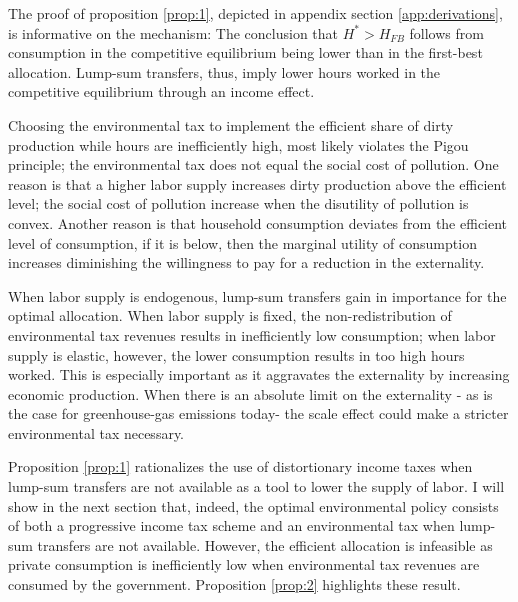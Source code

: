 

The proof of proposition \ref{prop:1}, depicted in appendix section \ref{app:derivations}, is informative on the mechanism: The conclusion that $H^*>H_{FB}$ follows from consumption in the competitive equilibrium being lower than in the first-best allocation. Lump-sum transfers, thus, imply lower hours worked in the competitive equilibrium through an income effect.

Choosing the environmental tax to implement the efficient share of dirty production while hours are inefficiently high, most likely  violates the Pigou principle; the environmental tax does not equal the social cost of pollution. One reason is that a higher labor supply increases dirty production above the efficient level; the social cost of pollution increase when the disutility of pollution is convex. Another reason is that household consumption deviates from the efficient level of consumption, if it is below, then the marginal utility of consumption increases diminishing the willingness to pay for a reduction in the externality. 

When labor supply is endogenous, lump-sum transfers gain in importance for the optimal allocation. When labor supply is fixed, the non-redistribution of environmental tax revenues results in inefficiently low consumption; when labor supply is elastic, however, the lower consumption results in too high hours worked. This is especially important as it aggravates the externality by increasing economic production. When there is an absolute limit on the externality - as is the case for greenhouse-gas emissions today- the scale effect could make a stricter environmental tax necessary. %

Proposition \ref{prop:1} rationalizes the use of distortionary income taxes when lump-sum transfers are not available as a tool to lower the supply of labor. 
I will show in the next section that, indeed, the optimal environmental policy consists of both a progressive income tax scheme and an environmental tax when lump-sum transfers are not available. However, the efficient allocation is infeasible as private consumption is inefficiently low when environmental tax revenues are consumed by the government. Proposition \ref{prop:2} highlights these result.

